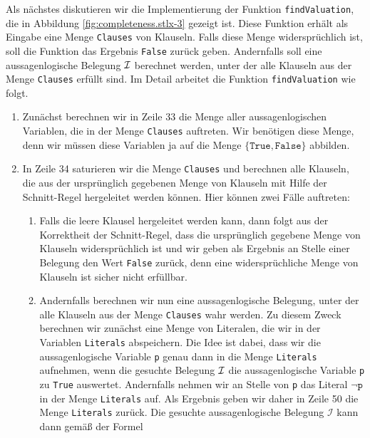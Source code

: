 Als nächstes diskutieren wir die Implementierung der Funktion \texttt{findValuation}, die in
Abbildung \ref{fig:completeness.stlx-3} gezeigt ist.  Diese Funktion erhält als Eingabe eine Menge
\texttt{Clauses} von Klauseln.  Falls diese Menge widersprüchlich ist, soll die Funktion
das Ergebnis \texttt{False} zurück geben.  Andernfalls soll eine aussagenlogische Belegung $\mathcal{I}$ berechnet werden,
unter der alle Klauseln aus der Menge \texttt{Clauses} erfüllt sind.  Im Detail arbeitet die
Funktion \texttt{findValuation} wie folgt.
\begin{enumerate}
\item Zunächst berechnen wir in Zeile 33 die Menge aller aussagenlogischen Variablen, die in
      der Menge \texttt{Clauses} auftreten.  Wir benötigen diese Menge, denn wir müssen diese
      Variablen ja auf die Menge $\{ \texttt{True}, \texttt{False} \}$ abbilden.
\item In Zeile 34 saturieren wir die Menge \texttt{Clauses} und berechnen alle Klauseln, die aus der
      ursprünglich gegebenen Menge von Klauseln mit Hilfe der Schnitt-Regel hergeleitet werden
      können.  Hier können zwei Fälle auftreten:
      \begin{enumerate}
      \item Falls die leere Klausel hergeleitet werden kann, dann folgt aus der Korrektheit der Schnitt-Regel,
            dass die ursprünglich gegebene Menge von Klauseln widersprüchlich ist und wir geben als Ergebnis an
            Stelle einer Belegung den Wert \texttt{False} zurück, denn eine widersprüchliche Menge von Klauseln
            ist sicher nicht erfüllbar.
      \item Andernfalls berechnen wir nun eine aussagenlogische Belegung, unter der alle Klauseln aus
            der Menge \texttt{Clauses} wahr werden.  Zu diesem Zweck berechnen wir zunächst eine Menge von
            Literalen, die wir in der Variablen \texttt{Literals} abspeichern.  Die Idee ist dabei, dass wir
            die aussagenlogische Variable \texttt{p} genau dann in die Menge \texttt{Literals} aufnehmen, wenn
            die gesuchte Belegung $\mathcal{I}$ die aussagenlogische
            Variable \texttt{p} zu \texttt{True} auswertet.  Andernfalls nehmen wir an Stelle von \texttt{p} das
            Literal $\neg \texttt{p}$ in der Menge \texttt{Literals} auf.  Als Ergebnis geben wir daher in
            Zeile 50 die Menge \texttt{Literals} zurück.  Die gesuchte aussagenlogische Belegung
            $\mathcal{I}$ kann dann gemäß der Formel  
            \\[0.2cm]

\end{enumerate}
\end{enumerate}
